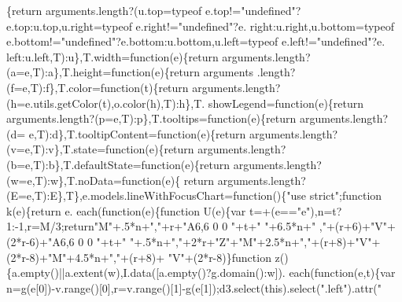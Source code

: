\begin{DoxyCode}
{      \{\textcolor{keywordflow}{return} arguments.length?(u.top=typeof e.top!=\textcolor{stringliteral}{"undefined"}?e.top:u.top,u.right=typeof e.right!=\textcolor{stringliteral}{"undefined"}?e.
      right:u.right,u.bottom=typeof e.bottom!=\textcolor{stringliteral}{"undefined"}?e.bottom:u.bottom,u.left=typeof e.left!=\textcolor{stringliteral}{"undefined"}?e.
      left:u.left,T):u\},T.width=\textcolor{keyword}{function}(e)\{\textcolor{keywordflow}{return} arguments.length?(a=e,T):a\},T.height=\textcolor{keyword}{function}(e)\{\textcolor{keywordflow}{return} arguments
      .length?(f=e,T):f\},T.color=\textcolor{keyword}{function}(t)\{\textcolor{keywordflow}{return} arguments.length?(h=e.utils.getColor(t),o.color(h),T):h\},T.
      showLegend=\textcolor{keyword}{function}(e)\{\textcolor{keywordflow}{return} arguments.length?(p=e,T):p\},T.tooltips=\textcolor{keyword}{function}(e)\{\textcolor{keywordflow}{return} arguments.length?(d=
      e,T):d\},T.tooltipContent=\textcolor{keyword}{function}(e)\{\textcolor{keywordflow}{return} arguments.length?(v=e,T):v\},T.state=\textcolor{keyword}{function}(e)\{\textcolor{keywordflow}{return} 
      arguments.length?(b=e,T):b\},T.defaultState=\textcolor{keyword}{function}(e)\{\textcolor{keywordflow}{return} arguments.length?(w=e,T):w\},T.noData=\textcolor{keyword}{function}(e)\{\textcolor{keywordflow}{
      return} arguments.length?(E=e,T):E\},T\},e.models.lineWithFocusChart=\textcolor{keyword}{function}()\{\textcolor{stringliteral}{"use strict"};\textcolor{keyword}{function} k(e)\{\textcolor{keywordflow}{return} e.
      each(\textcolor{keyword}{function}(e)\{\textcolor{keyword}{function} U(e)\{var t=+(e==\textcolor{stringliteral}{"e"}),n=t?1:-1,r=M/3;\textcolor{keywordflow}{return}\textcolor{stringliteral}{"M"}+.5*n+\textcolor{stringliteral}{","}+r+\textcolor{stringliteral}{"A6,6 0 0 "}+t+\textcolor{stringliteral}{" "}+6.5*n+\textcolor{stringliteral}{"
      ,"}+(r+6)+\textcolor{stringliteral}{"V"}+(2*r-6)+\textcolor{stringliteral}{"A6,6 0 0 "}+t+\textcolor{stringliteral}{" "}+.5*n+\textcolor{stringliteral}{","}+2*r+\textcolor{stringliteral}{"Z"}+\textcolor{stringliteral}{"M"}+2.5*n+\textcolor{stringliteral}{","}+(r+8)+\textcolor{stringliteral}{"V"}+(2*r-8)+\textcolor{stringliteral}{"M"}+4.5*n+\textcolor{stringliteral}{","}+(r+8)+\textcolor{stringliteral}{
      "V"}+(2*r-8)\}\textcolor{keyword}{function} z()\{a.empty()||a.extent(w),I.data([a.empty()?g.domain():w]).
      each(\textcolor{keyword}{function}(e,t)\{var n=g(e[0])-v.range()[0],r=v.range()[1]-g(e[1]);d3.select(\textcolor{keyword}{this}).select(\textcolor{stringliteral}{".left"}).attr(\textcolor{stringliteral}{"
}}
\end{DoxyCode}
